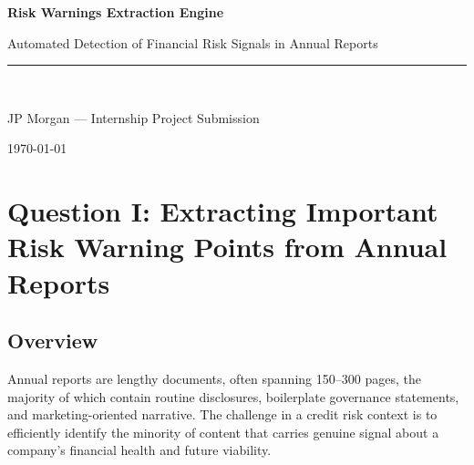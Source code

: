 \documentclass[12pt,a4paper]{article}
\begin{document}
\begin{titlepage}
  \centering
  \vspace*{2cm}
  {\Huge\bfseries\color{jpblue} Risk Warnings Extraction Engine\par}
  \vspace{0.5cm}
  {\large\color{codegray} Automated Detection of Financial Risk Signals in Annual Reports\par}
  \vspace{2cm}
  \rule{0.6\textwidth}{0.4pt}\\[0.5cm]
  {\large JP Morgan --- Internship Project Submission\par}
  \vspace{0.5cm}
  {\normalsize \today\par}
  \vspace{4cm}
  \begin{abstract}
    \noindent This report presents a systematic methodology for extracting risk warnings
    from corporate annual reports using a multi-stage large language model (LLM) pipeline.
    We identify the most informative sections of an annual report for credit risk assessment,
    design a structured extraction engine, and validate the approach against a curated set
    of annual reports from companies that subsequently filed for bankruptcy.
    The pipeline is designed for scalability and is well-suited to the volume of
    documents processed in a banking context.
  \end{abstract}
\end{titlepage}

\tableofcontents
\newpage

\section{Question I: Extracting Important Risk Warning Points from Annual Reports}

\subsection{Overview}

Annual reports are lengthy documents, often spanning 150--300 pages, the majority of which
contain routine disclosures, boilerplate governance statements, and marketing-oriented narrative.
The challenge in a credit risk context is to efficiently identify the minority of content
that carries genuine signal about a company's financial health and future viability.
\end{document}
